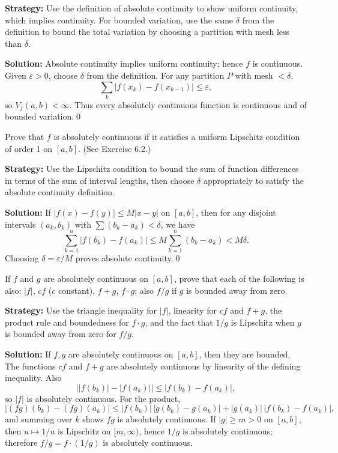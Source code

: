 \noindent\textbf{Strategy:} Use the definition of absolute continuity to show uniform continuity, which implies continuity. For bounded variation, use the same $\delta$ from the definition to bound the total variation by choosing a partition with mesh less than $\delta$.

\bigskip\noindent\textbf{Solution:}
Absolute continuity implies uniform continuity; hence $f$ is continuous. Given $\varepsilon>0$, choose $\delta$ from the definition. For any partition $P$ with mesh $<\delta$,
\[\sum_k |f(x_k)-f(x_{k-1})|\le\varepsilon,\]
so $V_f(a,b)<\infty$. Thus every absolutely continuous function is continuous and of bounded variation.\qed


\begin{problembox}
Prove that $f$ is absolutely continuous if it satisfies a uniform Lipschitz condition of order 1 on $[a, b]$. (See Exercise 6.2.)
\end{problembox}

\noindent\textbf{Strategy:} Use the Lipschitz condition to bound the sum of function differences in terms of the sum of interval lengths, then choose $\delta$ appropriately to satisfy the absolute continuity definition.

\bigskip\noindent\textbf{Solution:}
If $|f(x)-f(y)|\le M|x-y|$ on $[a,b]$, then for any disjoint intervals $(a_k,b_k)$ with $\sum(b_k-a_k)<\delta$, we have
\[\sum_{k=1}^n |f(b_k)-f(a_k)|\le M\sum_{k=1}^n(b_k-a_k)<M\delta.
\]
Choosing $\delta=\varepsilon/M$ proves absolute continuity.\qed


\begin{problembox}
If $f$ and $g$ are absolutely continuous on $[a, b]$, prove that each of the following is also: $|f|$, $cf$ ($c$ constant), $f + g$, $f \cdot g$; also $f/g$ if $g$ is bounded away from zero.
\end{problembox}

\noindent\textbf{Strategy:} Use the triangle inequality for $|f|$, linearity for $cf$ and $f+g$, the product rule and boundedness for $f \cdot g$, and the fact that $1/g$ is Lipschitz when $g$ is bounded away from zero for $f/g$.

\bigskip\noindent\textbf{Solution:}
If $f,g$ are absolutely continuous on $[a,b]$, then they are bounded. The functions $cf$ and $f+g$ are absolutely continuous by linearity of the defining inequality. Also
\[\big||f(b_k)|-|f(a_k)|\big|\le |f(b_k)-f(a_k)|,\]
so $|f|$ is absolutely continuous. For the product,
\[|(fg)(b_k)-(fg)(a_k)|\le |f(b_k)|\,|g(b_k)-g(a_k)|+|g(a_k)|\,|f(b_k)-f(a_k)|,\]
and summing over $k$ shows $fg$ is absolutely continuous. If $|g|\ge m>0$ on $[a,b]$, then $u\mapsto 1/u$ is Lipschitz on $[m,\infty)$, hence $1/g$ is absolutely continuous; therefore $f/g=f\cdot(1/g)$ is absolutely continuous.